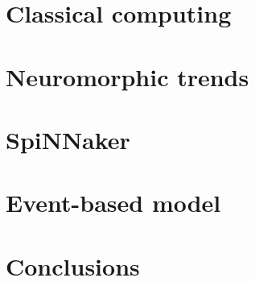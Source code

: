 
\section{Classical computing}

\section{Neuromorphic trends}

\section{SpiNNaker}

\section{Event-based model}

\section{Conclusions}
